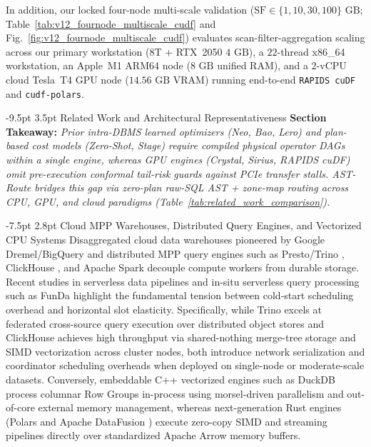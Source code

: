 \documentclass[10pt,a4paper]{article}
\makeatletter
\renewcommand\section{\@startsection{section}{1}{\z@}%
  {-9.5pt \@plus -2pt \@minus -1.5pt}%
  {3.5pt \@plus 1pt}%
  {\normalfont\large\bfseries}}
\renewcommand\subsection{\@startsection{subsection}{2}{\z@}%
  {-7.5pt \@plus -2pt \@minus -1pt}%
  {2.8pt \@plus 1pt}%
  {\normalfont\normalsize\bfseries}}
\makeatother
\begin{document}

In addition, our locked four-node multi-scale validation ($\text{SF}\in\{1,10,30,100\}\text{ GB}$; Table~\ref{tab:v12_fournode_multiscale_cudf} and Fig.~\ref{fig:v12_fournode_multiscale_cudf}) evaluates scan-filter-aggregation scaling across our primary workstation (8T + RTX~2050 $4\text{ GB}$), a $22$-thread x86\_64 workstation, an Apple~M1 ARM64 node ($8\text{ GB}$ unified RAM), and a 2-vCPU cloud Tesla~T4 GPU node ($14.56\text{ GB}$ VRAM) running end-to-end \texttt{RAPIDS cuDF}~\cite{rapids2024cudf} and \texttt{cudf-polars}.

\section{Related Work and Architectural Representativeness}
\noindent\textbf{Section Takeaway:} \emph{Prior intra-DBMS learned optimizers (Neo, Bao, Lero) and plan-based cost models (Zero-Shot, Stage) require compiled physical operator DAGs within a single engine, whereas GPU engines (Crystal, Sirius, RAPIDS cuDF) omit pre-execution conformal tail-risk guards against PCIe transfer stalls. AST-Route bridges this gap via zero-plan raw-SQL AST + zone-map routing across CPU, GPU, and cloud paradigms (Table~\ref{tab:related_work_comparison}).}\par\vspace{2pt}
\subsection{Cloud MPP Warehouses, Distributed Query Engines, and Vectorized CPU Systems}
Disaggregated cloud data warehouses pioneered by Google Dremel/BigQuery \cite{melnik2010dremel, melnik2020dremel} and distributed MPP query engines such as Presto/Trino \cite{sethi2019presto}, ClickHouse \cite{schulze2024clickhouse}, and Apache Spark \cite{ahmed2020hibench} decouple compute workers from durable storage. Recent studies in serverless data pipelines \cite{shojaee2024serverless} and in-situ serverless query processing such as FunDa \cite{lounissi2025funda} highlight the fundamental tension between cold-start scheduling overhead and horizontal slot elasticity. Specifically, while Trino \cite{sethi2019presto} excels at federated cross-source query execution over distributed object stores and ClickHouse \cite{schulze2024clickhouse} achieves high throughput via shared-nothing merge-tree storage and SIMD vectorization across cluster nodes, both introduce network serialization and coordinator scheduling overheads when deployed on single-node or moderate-scale datasets. Conversely, embeddable C++ vectorized engines such as DuckDB \cite{raasveldt2019duckdb, kuiper2024duckdb_ooc} process columnar Row Groups in-process using morsel-driven parallelism and out-of-core external memory management, whereas next-generation Rust engines (Polars and Apache DataFusion \cite{lamb2024datafusion}) execute zero-copy SIMD and streaming pipelines directly over standardized Apache Arrow memory buffers.
\end{document}
